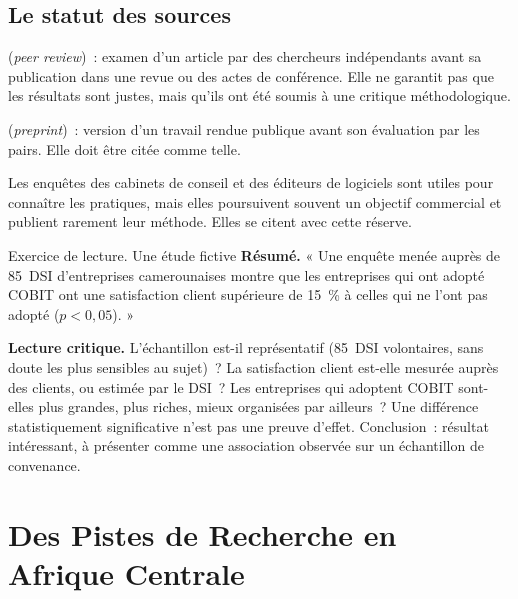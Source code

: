 \subsection{Le statut des sources}

\begin{boxdef}
(\textit{peer review})~: examen d'un article par des chercheurs
indépendants avant sa publication dans une revue ou des actes de
conférence. Elle ne garantit pas que les résultats sont justes, mais
qu'ils ont été soumis à une critique méthodologique.

\medskip
{} (\textit{preprint})~:
version d'un travail rendue publique avant son évaluation par les pairs.
Elle doit être citée comme telle.
\end{boxdef}

Les enquêtes des cabinets de conseil et des éditeurs de logiciels sont
utiles pour connaître les pratiques, mais elles poursuivent souvent un
objectif commercial et publient rarement leur méthode. Elles se citent
avec cette réserve.

\begin{boxscenario}{Exercice de lecture. Une étude fictive}
\textbf{Résumé.} « Une enquête menée auprès de 85~DSI d'entreprises
camerounaises montre que les entreprises qui ont adopté COBIT ont une
satisfaction client supérieure de 15~\% à celles qui ne l'ont pas adopté
($p < 0{,}05$). »

\medskip
\textbf{Lecture critique.} L'échantillon est-il représentatif (85~DSI
volontaires, sans doute les plus sensibles au sujet)~? La satisfaction
client est-elle mesurée auprès des clients, ou estimée par le DSI~? Les
entreprises qui adoptent COBIT sont-elles plus grandes, plus riches, mieux
organisées par ailleurs~? Une différence statistiquement significative
n'est pas une preuve d'effet. Conclusion~: résultat intéressant, à
présenter comme une association observée sur un échantillon de
convenance.
\end{boxscenario}

\section{Des Pistes de Recherche en Afrique Centrale}
\label{sec:c20-afrique}

